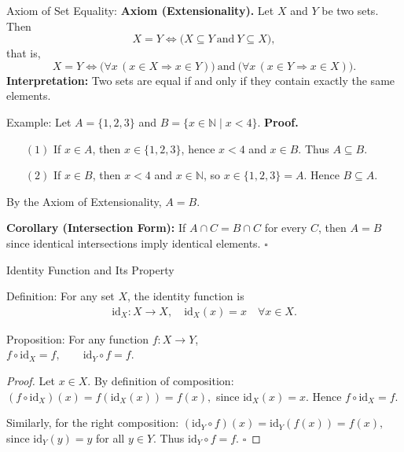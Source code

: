 \documentclass[11pt,aspectratio=43,ignorenonframetext,t]{beamer}
\newcounter{example_number} %
\begin{document}
\begin{frame}{Axiom of Set Equality:}
\textbf{Axiom (Extensionality).}  
Let $X$ and $Y$ be two sets. Then
\[
X = Y \iff \bigl( X \subseteq Y \ \text{and}\  Y \subseteq X \bigr),
\]
that is,
\[
X = Y \iff \bigl( \forall x\, (x \in X \Rightarrow x \in Y) \bigr)
\ \text{and}\ 
\bigl( \forall x\, (x \in Y \Rightarrow x \in X) \bigr).
\]
\textbf{Interpretation:} Two sets are equal if and only if they contain exactly the same elements.

\begin{exampleblock}{Example: Let $A = \{1,2,3\}$ and $B = \{x \in \mathbb{N} \mid x < 4\}$.}
\textbf{Proof.}
\begin{itemize}
  \item[$(1)$] If $x \in A$, then $x \in \{1,2,3\}$, hence $x < 4$ and $x \in B$. Thus $A \subseteq B$.
  \item[$(2)$] If $x \in B$, then $x < 4$ and $x \in \mathbb{N}$, so $x \in \{1,2,3\}=A$. Hence $B \subseteq A$.
\end{itemize}
By the Axiom of Extensionality, $A=B$.

\textbf{Corollary (Intersection Form):}  
If $A \cap C = B \cap C$ for every $C$, then $A=B$ since identical intersections imply identical elements. $\square$
\end{exampleblock}
\end{frame}

\begin{frame}{Identity Function and Its Property}
\vspace{-0.4cm}
\begin{block}{Definition:} For any set \(X\), the identity function is
\begin{align*}
\mathrm{id}_X: X \to X, \quad \mathrm{id}_X(x) = x \quad \forall x \in X.    
\end{align*}
\end{block}

\vspace{-0.5cm}
\begin{block}{Proposition:}
For any function \( f: X \to Y \),\\ $f \circ \mathrm{id}_X = f, \qquad \mathrm{id}_Y \circ f = f.$
\end{block}
\vspace{-0.4cm}
\begin{proof}
Let \(x \in X\).  
By definition of composition: $
(f \circ \mathrm{id}_X)(x) = f(\mathrm{id}_X(x)) = f(x),$  since \(\mathrm{id}_X(x) = x\).  
Hence \(f \circ \mathrm{id}_X = f.\)

Similarly, for the right composition: $(\mathrm{id}_Y \circ f)(x) = \mathrm{id}_Y(f(x)) = f(x),$ since \(\mathrm{id}_Y(y) = y\) for all \(y \in Y\).  
Thus \(\mathrm{id}_Y \circ f = f.\) \(\square\)
\end{proof}
\end{frame}
\end{document}
